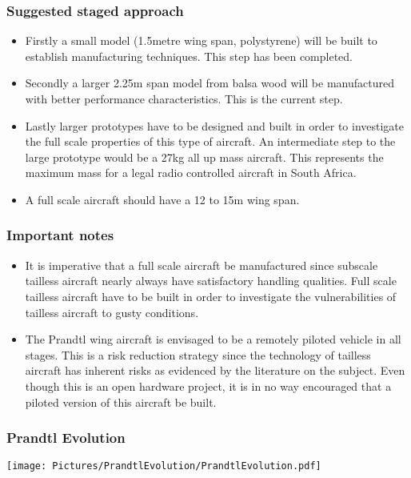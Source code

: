 \documentclass{beamer}
\begin{document}
\begin{frame}
\frametitle{Suggested staged approach}

\begin{itemize}
\item Firstly a small model (1.5metre wing span, polystyrene) will be built to establish manufacturing techniques.  This step has been completed.
\item Secondly a larger 2.25m span model from balsa wood will be manufactured with better performance characteristics.  This is the current step.
\item Lastly larger prototypes have to be designed and built in order to investigate the full scale properties of this type of aircraft.  An intermediate step to the large prototype would be a 27kg all up mass aircraft.  This represents the maximum mass for a legal radio controlled aircraft in South Africa.
\item A full scale aircraft should have a 12 to 15m wing span.  
\end{itemize}

\end{frame}


\begin{frame}
\frametitle{Important notes}

\begin{itemize}
\item It is imperative that a full scale aircraft 
be manufactured since subscale tailless aircraft nearly always have satisfactory handling qualities.  Full scale tailless aircraft 
have to be built in order to investigate the vulnerabilities of tailless aircraft to gusty conditions.
\item The Prandtl wing aircraft is envisaged to be a remotely piloted vehicle in all stages.  This is a risk reduction strategy since the technology of tailless aircraft has inherent risks as evidenced by the literature on the subject.  Even though this is an open hardware project, it is in no way encouraged that a piloted version of this aircraft be built.
\end{itemize}

\end{frame}


\begin{frame}
\frametitle{Prandtl Evolution}

\texttt{[image: Pictures/PrandtlEvolution/PrandtlEvolution.pdf]}

\end{frame}
\end{document}
